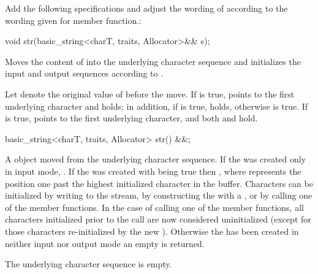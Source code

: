 \documentclass[ebook,11pt,article]{memoir}
\begin{document}
Add the following specifications and adjust the wording of  according to the wording given for  member function.:
\begin{itemdecl}
void str(basic_string<charT, traits, Allocator>&& s);
\end{itemdecl}
\begin{itemdescr}
\pnum
\effects 
Moves the content of  into the  underlying character sequence and initializes the input and output sequences according to .

\pnum
\postconditions
Let  denote the original value of  before the move.
If  is true,  points to the first underlying character and  holds; in addition, if  is true,  holds, otherwise  is true. If  is true,  points to the first underlying character, and both  and  hold.
\end{itemdescr}

\begin{itemdecl}
basic_string<charT, traits, Allocator> str() &&;
\end{itemdecl}
\begin{itemdescr}

\pnum
\returns A  object moved from the  underlying character sequence. If the  was created only in input mode, . If the  was created with  being true then , where  represents the position one past the highest initialized character in the buffer. Characters can be initialized by writing to the stream, by constructing the  with a , or by calling one of the  member functions. In the case of calling one of the  member functions, all characters initialized prior to the call are now considered uninitialized (except for those characters re-initialized by the new ). Otherwise the  has been created in neither input nor output mode an empty  is returned. 

\pnum
\postcondition The underlying character sequence is empty.
\end{itemdescr}
\end{document}
